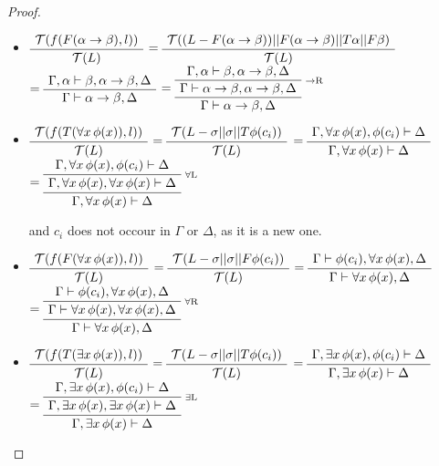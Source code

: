 \documentclass[runningheads]{llncs}
\begin{document}
\begin{proof}
{\begin {itemize}
\item 
$\AxiomC{$\mathcal{T}( f(F(\alpha \rightarrow \beta),l))$}\UnaryInfC{$\mathcal{T}(L)$}\DisplayProof$  
$=\AxiomC{$\mathcal{T}((L - F(\alpha \rightarrow \beta)) || F(\alpha \rightarrow \beta) || T \alpha || F \beta)$}\UnaryInfC{$\mathcal{T}(L)$}\DisplayProof$  
$=\AxiomC{$\Gamma , \alpha \vdash \beta, \alpha \rightarrow \beta, \Delta$}\UnaryInfC{$\Gamma \vdash \alpha \rightarrow \beta, \Delta$}\DisplayProof$
$=\RightLabel{\scriptsize{$\rightarrow$R}}\AxiomC{$\Gamma , \alpha \vdash \beta, \alpha \rightarrow \beta, \Delta$}\UnaryInfC{$\Gamma \vdash \alpha \rightarrow \beta, \alpha \rightarrow \beta, \Delta$}\UnaryInfC{$\Gamma \vdash \alpha \rightarrow \beta, \Delta$}\DisplayProof$

\item 
$\AxiomC{$\mathcal{T}( f(T(\forall x \, \phi(x)),l))$}\UnaryInfC{$\mathcal{T}(L)$}\DisplayProof$  
$=\AxiomC{$\mathcal{T}( L - \sigma|| \sigma || T \phi(c_i) )$}\UnaryInfC{$\mathcal{T}(L)$}\DisplayProof$  
$=\AxiomC{$\Gamma, \forall x \, \phi(x), \phi(c_i) \vdash \Delta$}\UnaryInfC{$\Gamma, \forall x \, \phi(x) \vdash \Delta$}\DisplayProof$  
$=\RightLabel{\scriptsize{$\forall$L}}\AxiomC{$\Gamma, \forall x \, \phi(x), \phi(c_i) \vdash \Delta$}\UnaryInfC{$\Gamma, \forall x \, \phi(x), \forall x \, \phi(x) \vdash \Delta$}\UnaryInfC{$\Gamma, \forall x \, \phi(x) \vdash \Delta$}\DisplayProof$

and $c_i$ does not occour in $\Gamma$ or $\Delta$, as it is a new one.
\item 
$\AxiomC{$\mathcal{T}( f(F(\forall x \, \phi(x)),l))$}\UnaryInfC{$\mathcal{T}(L)$}\DisplayProof$  
$=\AxiomC{$\mathcal{T}( L - \sigma|| \sigma || F \phi(c_i) )$}\UnaryInfC{$\mathcal{T}(L)$}\DisplayProof$  
$=\AxiomC{$\Gamma \vdash \phi(c_i), \forall x \, \phi(x), \Delta$}\UnaryInfC{$\Gamma \vdash \forall x \, \phi(x), \Delta$}\DisplayProof$  
$=\RightLabel{\scriptsize{$\forall$R}}\AxiomC{$\Gamma \vdash \phi(c_i), \forall x \, \phi(x), \Delta$}\UnaryInfC{$\Gamma \vdash \forall x \, \phi(x), \forall x \, \phi(x), \Delta$}\UnaryInfC{$\Gamma \vdash \forall x \, \phi(x), \Delta$}\DisplayProof$

\item 
$\AxiomC{$\mathcal{T}( f(T(\exists x \, \phi(x)),l))$}\UnaryInfC{$\mathcal{T}(L)$}\DisplayProof$  
$=\AxiomC{$\mathcal{T}( L - \sigma|| \sigma || T \phi(c_i) )$}\UnaryInfC{$\mathcal{T}(L)$}\DisplayProof$  
$=\AxiomC{$\Gamma, \exists x \, \phi(x), \phi(c_i) \vdash \Delta$}\UnaryInfC{$\Gamma, \exists x \, \phi(x) \vdash \Delta$}\DisplayProof$  
$=\RightLabel{\scriptsize{$\exists$L}}\AxiomC{$\Gamma, \exists x \, \phi(x), \phi(c_i) \vdash \Delta$}\UnaryInfC{$\Gamma, \exists x \, \phi(x), \exists x \, \phi(x) \vdash \Delta$}\UnaryInfC{$\Gamma, \exists x \, \phi(x) \vdash \Delta$}\DisplayProof$


\end{itemize}}
\end{proof}
\end{document}
